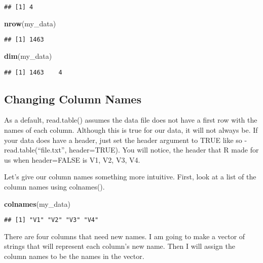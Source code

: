 \documentclass[]{article}
\newenvironment{Shaded}{\begin{snugshade}}{\end{snugshade}}
\newcommand{\KeywordTok}[1]{\textcolor[rgb]{0.13,0.29,0.53}{\textbf{#1}}}
\newcommand{\NormalTok}[1]{#1}
\begin{document}
\begin{verbatim}
## [1] 4
\end{verbatim}

\begin{Shaded}
\begin{Highlighting}[]
\KeywordTok{nrow}\NormalTok{(my_data)}
\end{Highlighting}
\end{Shaded}

\begin{verbatim}
## [1] 1463
\end{verbatim}

\begin{Shaded}
\begin{Highlighting}[]
\KeywordTok{dim}\NormalTok{(my_data)}
\end{Highlighting}
\end{Shaded}

\begin{verbatim}
## [1] 1463    4
\end{verbatim}

\subsection{Changing Column Names}\label{changing-column-names}

As a default, read.table() assumes the data file does not have a first
row with the names of each column. Although this is true for our data,
it will not always be. If your data does have a header, just set the
header argument to TRUE like so - read.table(``file.txt'', header=TRUE).
You will notice, the header that R made for us when header=FALSE is V1,
V2, V3, V4.

Let's give our column names something more intuitive. First, look at a
list of the column names using colnames().

\begin{Shaded}
\begin{Highlighting}[]
\KeywordTok{colnames}\NormalTok{(my_data)}
\end{Highlighting}
\end{Shaded}

\begin{verbatim}
## [1] "V1" "V2" "V3" "V4"
\end{verbatim}

There are four columns that need new names. I am going to make a vector
of strings that will represent each column's new name. Then I will
assign the column names to be the names in the vector.
\end{document}
